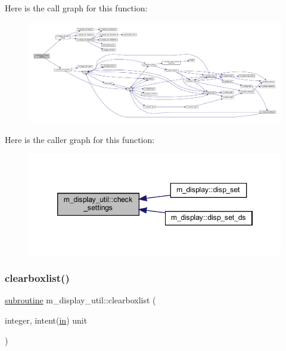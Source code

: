 Here is the call graph for this function\+:
\nopagebreak
\begin{figure}[H]
\begin{center}
\leavevmode
\includegraphics[width=350pt]{namespacem__display__util_ad15e85a03cd2a7ef8f405fbb9c1061af_cgraph}
\end{center}
\end{figure}
Here is the caller graph for this function\+:
\nopagebreak
\begin{figure}[H]
\begin{center}
\leavevmode
\includegraphics[width=346pt]{namespacem__display__util_ad15e85a03cd2a7ef8f405fbb9c1061af_icgraph}
\end{center}
\end{figure}
\mbox{\label{namespacem__display__util_acc9b3b8faeba5d61ec46d3d76c161d27}} 
\subsubsection{\texorpdfstring{clearboxlist()}{clearboxlist()}}
{\footnotesize\ttfamily \hyperlink{M__stopwatch_83_8txt_acfbcff50169d691ff02d4a123ed70482}{subroutine} m\+\_\+display\+\_\+util\+::clearboxlist (\begin{DoxyParamCaption}\item[{integer, intent(\hyperlink{M__journal_83_8txt_afce72651d1eed785a2132bee863b2f38}{in})}]{unit }\end{DoxyParamCaption})\hspace{0.3cm}{\ttfamily [private]}}



